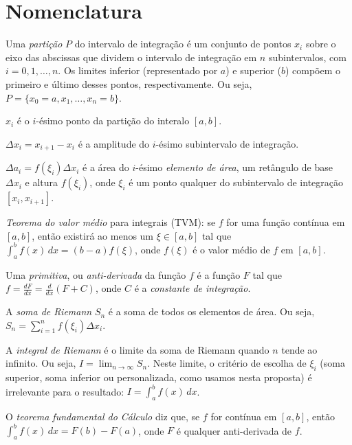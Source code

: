 \documentclass[a4paper,12pt]{scrartcl}
\begin{document}
  \section*{Nomenclatura}
    \begin{compactitem}
      \item Uma \emph{partição} $P$ do intervalo de integração é um conjunto de pontos $x_i$ sobre o eixo das abscissas que dividem o intervalo de integração em $n$ subintervalos, com $i = 0, 1, \ldots, n$. Os limites inferior (representado por $a$) e superior ($b$) compõem o primeiro e último desses pontos, respectivamente. Ou seja, $P = \{x_0 = a, x_1, \ldots, x_n = b\}$.
      
      \item $x_i$ é o $i$-ésimo ponto da partição do interalo $[a,b]$.
      
      \item $\Delta x_i = x_{i+1} - x_i$ é a amplitude do $i$-ésimo subintervalo de integração.
      
      \item $\Delta a_i = f(\xi_i) \Delta x_i$ é a área do $i$-ésimo \emph{elemento de área}, um retângulo de base $\Delta x_i$ e altura $f(\xi_i)$, onde $\xi_i$ é um ponto qualquer do subintervalo de integração $[x_i, x_{i + 1}]$.

      \item \emph{Teorema do valor médio} para integrais (TVM): se $f$ for uma função contínua em $[a,b]$, então existirá ao menos um $\xi \in [a,b]$ tal que $\int_a^b f(x)\,dx = (b-a) f(\xi)$, onde $f(\xi)$ é o valor médio de $f$ em $[a,b]$.

      \item Uma \emph{primitiva}, ou \emph{anti-derivada} da função $f$ é a função $F$ tal que $f = \frac{dF}{dx} = \frac{d}{dx}\left(F + C\right)$, onde $C$ é a \emph{constante de integração}.

      \item A \emph{soma de Riemann} $S_n$ é a soma de todos os elementos de área. Ou seja, $S_n = \sum_{i=1}^{n} f(\xi_i) \Delta x_i$.

      \item A \emph{integral de Riemann} é o limite da soma de Riemann quando $n$ tende ao infinito. Ou seja, $I = \lim_{n \to \infty} S_n$. Neste limite, o critério de escolha de $\xi_i$ (soma superior, soma inferior ou personalizada, como usamos nesta proposta) é irrelevante para o resultado: $I = \int_a^b f(x)\, dx$.

      \item O \emph{teorema fundamental do Cálculo} diz que, se $f$ for contínua em $[a,b]$, então $\int_a^b f(x)\,dx = F(b) - F(a)$, onde $F$ é qualquer anti-derivada de $f$.
    \end{compactitem}
\end{document}

